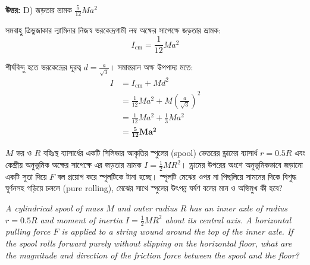 \documentclass[12pt, a4paper]{article}
\begin{document}
\vspace{0.5em}
\begin{tcolorbox}[answerbox]
    \textbf{\color{success} উত্তর:} D) জড়তার ভ্রামক $\frac{5}{12} M a^2$
\end{tcolorbox}
\vspace{1em}

\begin{tcolorbox}[solutionbox={সমাধান (Solution)}]
    \noindent
    সমবাহু ত্রিভুজাকার ল্যামিনার নিজস্ব ভরকেন্দ্রগামী লম্ব অক্ষের সাপেক্ষে জড়তার ভ্রামক:
    \[ I_{\text{cm}} = \frac{1}{12} M a^2 \]
    
    শীর্ষবিন্দু হতে ভরকেন্দ্রের দূরত্ব $d = \frac{a}{\sqrt{3}}$। সমান্তরাল অক্ষ উপপাদ্য মতে:
    \begin{align*}
        I &= I_{\text{cm}} + M d^2 \\
          &= \frac{1}{12} M a^2 + M \left(\frac{a}{\sqrt{3}}\right)^2 \\
          &= \frac{1}{12} M a^2 + \frac{1}{3} M a^2 \\
          &= \mathbf{\frac{5}{12} M a^2}
    \end{align*}
\end{tcolorbox}

\newpage

\begin{tcolorbox}[questionbox={প্রশ্ন (Question) 16}]
    \noindent
    $M$ ভর ও $R$ বহিঃস্থ ব্যাসার্ধের একটি সিলিন্ডার আকৃতির স্পুলের (spool) ভেতরের ড্রামের ব্যাসার্ধ $r = 0.5R$ এবং কেন্দ্রীয় অনুভূমিক অক্ষের সাপেক্ষে এর জড়তার ভ্রামক $I = \frac{1}{2} M R^2$। ড্রামের উপরের অংশে অনুভূমিকভাবে জড়ানো একটি সুতা দিয়ে $F$ বল প্রয়োগ করে স্পুলটিকে টানা হচ্ছে। স্পুলটি মেঝের ওপর না পিছলিয়ে সামনের দিকে বিশুদ্ধ ঘূর্ণনসহ গড়িয়ে চললে (pure rolling), মেঝের সাথে স্পুলের উৎপন্ন ঘর্ষণ বলের মান ও অভিমুখ কী হবে?
    
    \vspace{0.8em}
    \begin{english}
    \noindent\textit{\color{darkgray}
    A cylindrical spool of mass $M$ and outer radius $R$ has an inner axle of radius $r = 0.5R$ and moment of inertia $I = \frac{1}{2} M R^2$ about its central axis. A horizontal pulling force $F$ is applied to a string wound around the top of the inner axle. If the spool rolls forward purely without slipping on the horizontal floor, what are the magnitude and direction of the friction force between the spool and the floor?
    }
    \end{english}
\end{tcolorbox}
\end{document}
